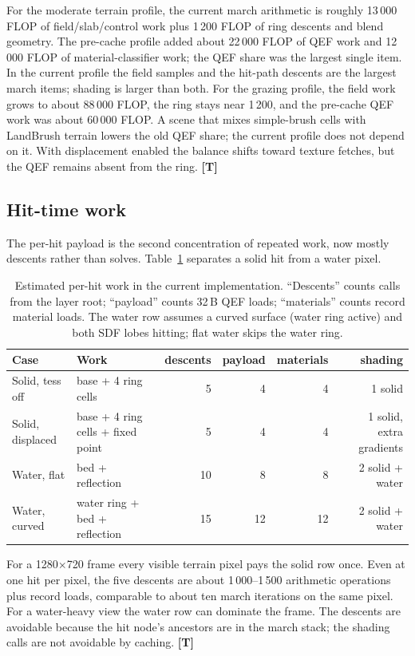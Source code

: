 \documentclass[11pt,a4paper]{article}
\newcommand{\evT}{\textsf{\textbf{\color{evT}[T]}}}
\newcommand{\code}[1]{\texttt{\detokenize{#1}}}
\theoremstyle{plain}
\theoremstyle{definition}
\theoremstyle{remark}
\begin{document}
For the moderate terrain profile, the current march arithmetic is roughly
13\,000 FLOP of field/slab/control work plus 1\,200 FLOP of ring descents and
blend geometry. The pre-cache profile added about 22\,000 FLOP of QEF work and
12\,000 FLOP of material-classifier work; the QEF share was the largest single
item. In the current profile the field samples and the hit-path descents are the
largest march items; shading is larger than both. For the grazing profile, the
field work grows to about 88\,000 FLOP, the ring stays near 1\,200, and the
pre-cache QEF work was about 60\,000 FLOP. A scene that mixes simple-brush
cells with LandBrush terrain lowers the old QEF share; the current profile does
not depend on it. With displacement enabled the balance shifts toward texture
fetches, but the QEF remains absent from the ring. \evT

\subsection{Hit-time work}

The per-hit payload is the second concentration of repeated work, now mostly
descents rather than solves. Table~\ref{tab:hitcost} separates a solid hit from
a water pixel.

\begin{table}[t]
\centering
\small
\caption{Estimated per-hit work in the current implementation. ``Descents''
counts \code{rmFindNodeAt} calls from the layer root; ``payload'' counts 32\,B
QEF loads; ``materials'' counts record material loads. The water row assumes a
curved surface (water ring active) and both SDF lobes hitting; flat water skips
the water ring.}
\label{tab:hitcost}
\begin{tabularx}{\linewidth}{@{}lXrrrr@{}}
\toprule
Case & Work & descents & payload & materials & shading \\
\midrule
Solid, tess off & base + 4 ring cells & 5 & 4 & 4 & 1 solid \\
Solid, displaced & base + 4 ring cells + fixed point & 5 & 4 & 4 & 1 solid, extra gradients \\
Water, flat & bed + reflection & 10 & 8 & 8 & 2 solid + water \\
Water, curved & water ring + bed + reflection & 15 & 12 & 12 & 2 solid + water \\
\bottomrule
\end{tabularx}
\end{table}

For a 1280$\times$720 frame every visible terrain pixel pays the solid row once.
Even at one hit per pixel, the five descents are about 1\,000--1\,500 arithmetic
operations plus record loads, comparable to about ten march iterations on the
same pixel. For a water-heavy view the water row can dominate the frame. The
descents are avoidable because the hit node's ancestors are in the march stack;
the shading calls are not avoidable by caching. \evT
\end{document}
